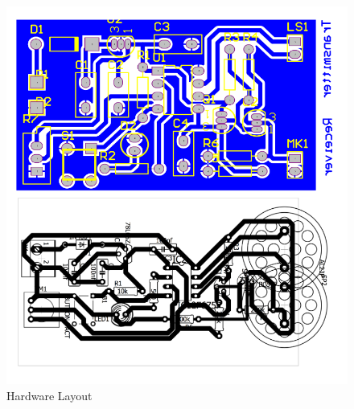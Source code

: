 \documentclass[a4paper]{article}
\begin{document}
\begin{landscape}
\begin{figure}[b!]
    \centering
    \includegraphics{img/hardware_layout.PNG}
    \caption{Hardware Layout}
    \label{fig:hardware_layout}
\end{figure}

\end{landscape}
\end{document}
